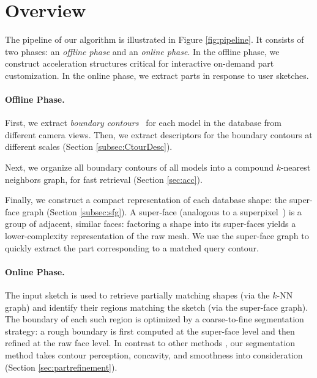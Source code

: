 \section{Overview}

The pipeline of our algorithm is illustrated in Figure \ref{fig:pipeline}. It consists of two phases: an \emph{offline phase} and an \emph{online phase}. In the offline phase, we construct acceleration structures critical for interactive on-demand part customization. In the online phase, we extract parts in response to user sketches.

\paragraph*{Offline Phase.}
First, we extract {\em boundary contours}~\cite{suggestivecontoursrusinkiewicztog2003} for each model in the database from different camera views. Then, we extract descriptors for the boundary contours at different scales (Section \ref{subsec:CtourDesc}).

Next, we organize all boundary contours of all models into a compound $k$-nearest neighbors graph, for fast retrieval (Section \ref{sec:acc}).

Finally, we construct a compact representation of each database shape: the super-face graph (Section \ref{subsec:sfg}). A super-face (analogous to a superpixel~\cite{RenLCM2003}) is a group of adjacent, similar faces: factoring a shape into its super-faces yields a lower-complexity representation of the raw mesh. We use the super-face graph to quickly extract the part corresponding to a matched query contour.

\paragraph*{Online Phase.}
The input sketch is used to retrieve partially matching shapes (via the $k$-NN graph) and identify their regions matching the sketch (via the super-face graph). The boundary of each such region is optimized by a coarse-to-fine segmentation strategy: a rough boundary is first computed at the super-face level and then refined at the raw face level. In contrast to other methods \cite{surveyonmeshsegmentationshamircgf2008}, our segmentation method takes contour perception, concavity, and smoothness into consideration (Section \ref{sec:partrefinement}).
